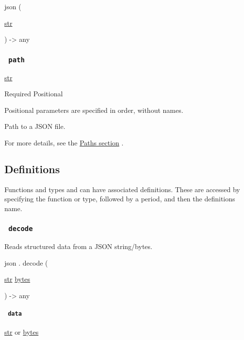 { json } (

{ \href{/docs/reference/foundations/str/}{str} }

) -\textgreater{} { any }

\subsubsection{\texorpdfstring{\texttt{\ path\ }}{ path }}\label{parameters-path}

\href{/docs/reference/foundations/str/}{str}

{Required} {{ Positional }}

\label{parameters-path-positional-tooltip}
Positional parameters are specified in order, without names.

Path to a JSON file.

For more details, see the \href{/docs/reference/syntax/\#paths}{Paths
section} .

\subsection{\texorpdfstring{{ Definitions
}}{ Definitions }}\label{definitions}

\label{definitions-tooltip}
Functions and types and can have associated definitions. These are
accessed by specifying the function or type, followed by a period, and
then the definition\textquotesingle s name.

\subsubsection{\texorpdfstring{\texttt{\ decode\ }}{ decode }}\label{definitions-decode}

Reads structured data from a JSON string/bytes.

json { . } { decode } (

{ \href{/docs/reference/foundations/str/}{str}
\href{/docs/reference/foundations/bytes/}{bytes} }

) -\textgreater{} { any }

\paragraph{\texorpdfstring{\texttt{\ data\ }}{ data }}\label{definitions-decode-data}

\href{/docs/reference/foundations/str/}{str} {or}
\href{/docs/reference/foundations/bytes/}{bytes}

